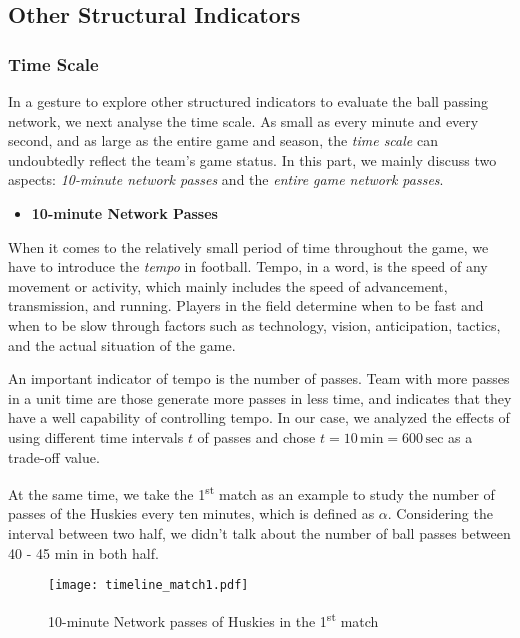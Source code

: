 \documentclass[12pt]{article}  %
\begin{document}
\subsection{Other Structural Indicators}
\subsubsection{Time Scale}
In a gesture to explore other structured indicators to evaluate the ball passing network, we next analyse the time scale. As small as every minute and every second, and as large as the entire game and season, the \textit{time scale} can undoubtedly reflect the team's game status. In this part, we mainly discuss two aspects: \textit{10-minute network passes} and the \textit{entire game network passes}. 

\clearpage
\begin{itemize}
    \item \textbf{10-minute Network Passes}
\end{itemize}

When it comes to the relatively small period of time throughout the game, we have to introduce the \textit{tempo} in football. 
Tempo, in a word, is the speed of any movement or activity, which mainly includes the speed of advancement, transmission, and  running. Players in the field determine when to be fast and when to be slow through factors such as technology, vision, anticipation, tactics, and the actual situation of the game.

An important indicator of tempo is the number of passes. Team with more passes in a unit time are those generate more passes in less time, and indicates that they have a well capability of controlling tempo. In our case, we analyzed the effects of using different time intervals $t$ of passes and chose $t = 10 \,\mathrm{min}=600\,\mathrm{sec}$ as a trade-off value. 

At the same time, we take the 1\textsuperscript{st} match as an example to study the number of passes of the Huskies every ten minutes, which is defined as $\alpha$. Considering the interval between two half, we didn't talk about the number of ball passes between 40 - 45 min in both half. 

\begin{figure}[htbp]
    \centering
    \texttt{[image: timeline\_match1.pdf]} 	%
    \caption{10-minute Network passes of Huskies in the 1\textsuperscript{st} match}		%
    \label{fig:timeline_match1}							%
\end{figure}
\end{document}
